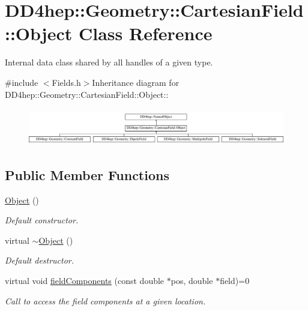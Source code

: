 \hypertarget{class_d_d4hep_1_1_geometry_1_1_cartesian_field_1_1_object}{
\section{DD4hep::Geometry::CartesianField::Object Class Reference}
\label{class_d_d4hep_1_1_geometry_1_1_cartesian_field_1_1_object}
}


Internal data class shared by all handles of a given type.  


{\ttfamily \#include $<$Fields.h$>$}Inheritance diagram for DD4hep::Geometry::CartesianField::Object::\begin{figure}[H]
\begin{center}
\leavevmode
\includegraphics[height=1.63424cm]{class_d_d4hep_1_1_geometry_1_1_cartesian_field_1_1_object}
\end{center}
\end{figure}
\subsection*{Public Member Functions}
\begin{DoxyCompactItemize}
\item 
\hyperlink{class_d_d4hep_1_1_geometry_1_1_cartesian_field_1_1_object_ae9c0b05f25b59b27e047ddf7538dbe2b}{Object} ()
\begin{DoxyCompactList}\small\item\em Default constructor. \item\end{DoxyCompactList}\item 
virtual \hyperlink{class_d_d4hep_1_1_geometry_1_1_cartesian_field_1_1_object_a8bc1219e4d9ef209dd929f96c7dfd5b4}{$\sim$Object} ()
\begin{DoxyCompactList}\small\item\em Default destructor. \item\end{DoxyCompactList}\item 
virtual void \hyperlink{class_d_d4hep_1_1_geometry_1_1_cartesian_field_1_1_object_ab3fa7f39545c8b0f769ee1ddfd03ed90}{fieldComponents} (const double $\ast$pos, double $\ast$field)=0
\begin{DoxyCompactList}\small\item\em Call to access the field components at a given location. \item\end{DoxyCompactList}\end{DoxyCompactItemize}
